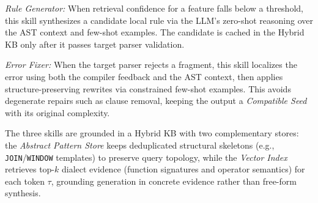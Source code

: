 \documentclass[conference]{IEEEtran}
\newcommand{\tool}{\textsc{Morph}\xspace}
\begin{document}
\textit{Rule Generator:} When retrieval confidence for a feature falls below a threshold, this skill synthesizes a candidate local rule via the LLM's zero-shot reasoning over the AST context and few-shot examples. The candidate is cached in the Hybrid KB only after it passes target parser validation.


\textit{Error Fixer:} When the target parser rejects a fragment, this skill localizes the error using both the compiler feedback and the AST context, then applies structure-preserving rewrites via constrained few-shot examples. This avoids degenerate repairs such as clause removal, keeping the output a \textit{Compatible Seed} with its original complexity.

The three skills are grounded in a Hybrid KB with two complementary stores: the \textit{Abstract Pattern Store} keeps deduplicated structural skeletons (e.g., \texttt{JOIN}/\texttt{WINDOW} templates) to preserve query topology, while the \textit{Vector Index} retrieves top-$k$ dialect evidence (function signatures and operator semantics) for each token $\tau$, grounding generation in concrete evidence rather than free-form synthesis.
\end{document}
